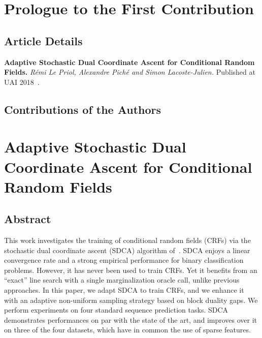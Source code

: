 \setcounter{theorem}{0}

\def\balpha{\boldsymbol{\alpha}}
\def\bmu{\boldsymbol{\mu}}
\def\bw{\boldsymbol{w}}
\newcommand{\bu}{\bm u}
\newcommand{\bv}{\bm v}
\newcommand{\strgconvex}{\mu}
\newcommand{\QM}{QM} %

\chapter{Prologue to the First Contribution}

\section{Article Details}

\textbf{Adaptive Stochastic Dual Coordinate Ascent for Conditional Random Fields.} 
\emph{R\'emi Le Priol, Alexandre Pich\'e and Simon Lacoste-Julien.} 
Published at UAI 2018~\citep{lepriol2018adaptive}.

\section{Contributions of the Authors}



\chapter{Adaptive Stochastic Dual Coordinate Ascent for Conditional Random Fields}

 \section*{Abstract}
This work investigates the training of conditional random fields (CRFs) via the stochastic dual coordinate ascent (SDCA) algorithm of~\citet{shalev2016accelerated}.
SDCA enjoys a linear convergence rate and a strong empirical performance for binary classification problems.
However, it has never been used to train CRFs.
Yet it benefits from an ``exact'' line search with a single marginalization oracle call, unlike previous approaches.
In this paper, we adapt SDCA to train CRFs, and we enhance it with an adaptive non-uniform sampling strategy based on block duality gaps.
We perform experiments on four standard sequence prediction tasks.
SDCA demonstrates performances on par with the state of the art, and improves over it on three of the four datasets, which have in common the use of sparse features.

